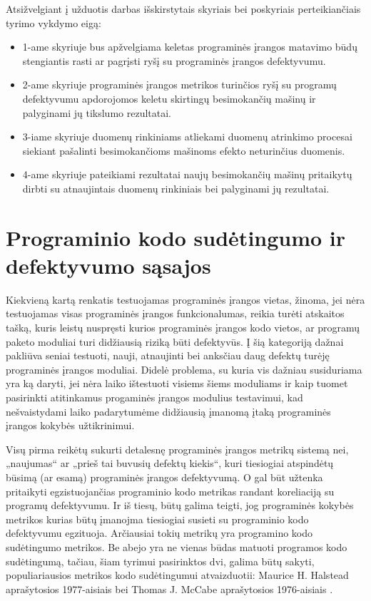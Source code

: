 \documentclass{VUMIFPSbakalaurinis}
\begin{document}
Atsižvelgiant į užduotis darbas išskirstytais skyriais bei poskyriais perteikiančiais tyrimo vykdymo eigą:
\begin{itemize}
\item[] 1-ame skyriuje bus apžvelgiama keletas programinės įrangos matavimo būdų stengiantis rasti ar pagrįsti ryšį su programinės įrangos defektyvumu.
\item[] 2-ame skyriuje programinės įrangos metrikos turinčios ryšį su programų defektyvumu apdorojomos keletu skirtingų besimokančių mašinų ir palyginami jų tikslumo rezultatai.
\item[] 3-iame skyriuje duomenų rinkiniams atliekami duomenų atrinkimo procesai siekiant pašalinti besimokančioms mašinoms efekto neturinčius duomenis.
\item[] 4-ame skyriuje pateikiami rezultatai naujų besimokančių mašinų pritaikytų dirbti su atnaujintais duomenų rinkiniais bei palyginami jų rezultatai.
\end{itemize}
 
\section{Programinio kodo sudėtingumo ir defektyvumo sąsajos}
Kiekvieną kartą renkatis testuojamas programinės įrangos vietas, žinoma, jei nėra testuojamas visas programinės įrangos funkcionalumas, reikia turėti atskaitos tašką, kuris leistų nuspręsti kurios programinės įrangos kodo vietos, ar programų paketo moduliai turi didžiausią riziką būti defektyvūs. Į šią kategoriją dažnai pakliūva seniai testuoti, nauji, atnaujinti bei anksčiau daug defektų turėję programinės įrangos moduliai. Didelė problema, su kuria vis dažniau susiduriama yra ką daryti, jei nėra laiko ištestuoti visiems šiems moduliams ir kaip tuomet pasirinkti atitinkamus progaminės įrangos modulius testavimui, kad nešvaistydami laiko padarytumėme didžiausią įmanomą įtaką programinės įrangos kokybės užtikrinimui. 

Visų pirma reikėtų sukurti detalesnę programinės įrangos metrikų sistemą nei, „naujumas“ ar „prieš tai buvusių defektų kiekis“, kuri tiesiogiai atspindėtų būsimą (ar esamą) programinės įrangos defektyvumą. O gal būt užtenka pritaikyti egzistuojančias programinio kodo metrikas randant koreliaciją su programų defektyvumu. Ir iš tiesų, būtų galima teigti, jog programinės kokybės metrikos kurias būtų įmanojma tiesiogiai susieti su programinio kodo defektyvumu egzituoja. Arčiausiai tokių metrikų yra programino kodo sudėtingumo metrikos. Be abejo yra ne vienas būdas matuoti programos kodo sudėtingumą, tačiau, šiam tyrimui pasirinktos dvi, galima būtų sakyti, populiariausios metrikos kodo sudėtingumui atvaizduotii: Maurice H. Halstead aprašytosios 1977-aisiais \cite{Halstead:1977:ESS:540137} bei Thomas J. McCabe aprašytosios 1976-aisiais \cite{McCabe:1976:CM:800253.807712}. 
\end{document}
